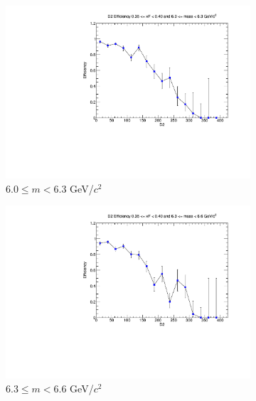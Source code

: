 \begin{figure}[p]
\begin{subfigure}[b]{0.32\textwidth}
        \includegraphics[width=\textwidth]{./kTrackerEfficiencyPlots/D2_Efficiency_xF7_mass6.pdf}
        \caption{$6.0 \leq m < 6.3$ GeV/$c^2$}
        \label{fig:xF7_mass6}
    \end{subfigure}
    \hfill
    \begin{subfigure}[b]{0.32\textwidth}
        \centering
        \includegraphics[width=\textwidth]{./kTrackerEfficiencyPlots/D2_Efficiency_xF7_mass7.pdf}
        \caption{$6.3 \leq m < 6.6$ GeV/$c^2$}
        \label{fig:xF7_mass7}
    \end{subfigure}
    \hfill
    \begin{subfigure}[b]{0.32\textwidth}
        \centering

\end{subfigure}
\end{figure}
